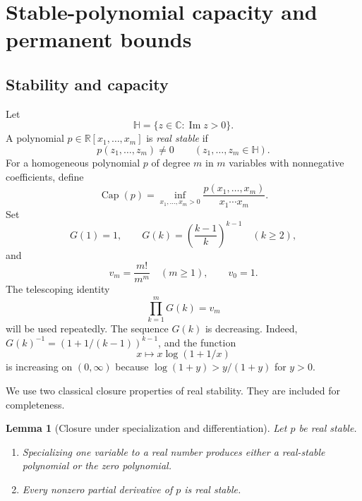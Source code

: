 \documentclass[11pt]{article}
\newtheorem{lemma}[theorem]{Lemma}
\theoremstyle{definition}
\newcommand{\pcap}{\operatorname{Cap}}
\newcommand{\1}{\mathbf{1}}
\newcommand{\cH}{\mathbb{H}}
\begin{document}
\section{Stable-polynomial capacity and permanent bounds}\label{sec:capacity}

\subsection{Stability and capacity}

Let
\[
 \cH=\{z\in\mathbb C:\operatorname{Im}z>0\}.
\]
A polynomial $p\in\mathbb R[x_1,\dots,x_m]$ is \emph{real stable} if
\[
 p(z_1,\dots,z_m)\ne0
 \qquad(z_1,\dots,z_m\in\cH).
\]
For a homogeneous polynomial $p$ of degree $m$ in $m$ variables with nonnegative coefficients, define
\[
 \pcap(p)=\inf_{x_1,\dots,x_m>0}
 \frac{p(x_1,\dots,x_m)}{x_1\cdots x_m}.
\]
Set
\[
 G(1)=1,
 \qquad
 G(k)=\left(\frac{k-1}{k}\right)^{k-1}\quad(k\ge2),
\]
and
\[
 v_m=\frac{m!}{m^m}\quad(m\ge1),
 \qquad v_0=1.
\]
The telescoping identity
\[
 \prod_{k=1}^mG(k)=v_m
 \tag{3.1}\label{eq:telescoping}
\]
will be used repeatedly.  The sequence $G(k)$ is decreasing.  Indeed,
$G(k)^{-1}=(1+1/(k-1))^{k-1}$, and the function
\[
 x\longmapsto x\log(1+1/x)
\]
is increasing on $(0,\infty)$ because
$\log(1+y)>y/(1+y)$ for $y>0$.

We use two classical closure properties of real stability.  They are included for completeness.

\begin{lemma}[Closure under specialization and differentiation]\label{lem:stability-closure}
Let $p$ be real stable.
\begin{enumerate}[label=\textup{(\roman*)}]
\item Specializing one variable to a real number produces either a real-stable polynomial or the zero polynomial.
\item Every nonzero partial derivative of $p$ is real stable.
\end{enumerate}
\end{lemma}
\end{document}
